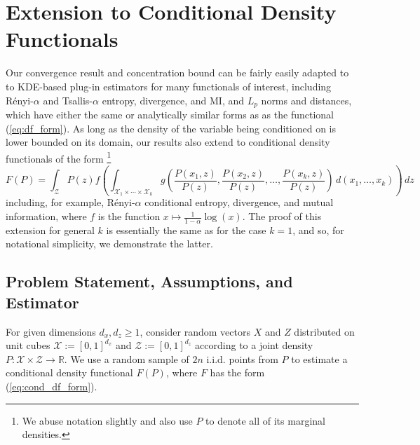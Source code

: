 \documentclass{article} %
\newcommand{\R}{\mathbb{R}}                         %
\newcommand{\X}{\mathcal{X}}                        %
\newcommand{\Z}{\mathcal{Z}}                        %
\begin{document}
\section{Extension to Conditional Density Functionals}
Our convergence result and concentration bound can be fairly easily adapted to
to KDE-based plug-in estimators for many functionals of interest, including
R\'enyi-$\alpha$ and Tsallis-$\alpha$ entropy, divergence, and MI, and
$L_p$ norms and distances, which have either the same or analytically similar
forms as as the functional (\ref{eq:df_form}). As long as the density of the
variable being conditioned on is lower bounded on its domain, our results also
extend to conditional density functionals of the form
\footnote{We abuse notation slightly and also use $P$ to denote all of its
marginal densities.}
\begin{equation}
F(P)
    = \int_\Z P(z) f\left(
            \int_{\X_1 \times \cdots \times \X_k} g\left(
                \frac{P(x_1,z)}{P(z)},
                \frac{P(x_2,z)}{P(z)},
                \dots,
                \frac{P(x_k,z)}{P(z)}
            \right) \, d(x_1,\dots,x_k)
        \right) \, dz
\label{eq:cond_df_form}
\end{equation}
including, for example, R\'enyi-$\alpha$ conditional entropy, divergence, and
mutual information, where $f$ is the function
$x \mapsto \frac{1}{1 - \alpha} \log(x)$. The proof of this extension for
general $k$ is essentially the same as for the case $k = 1$, and so, for
notational simplicity, we demonstrate the latter.

\subsection{Problem Statement, Assumptions, and Estimator}
For given dimensions $d_x,d_z \geq 1$, consider random vectors $X$ and $Z$
distributed on unit cubes $\X := [0,1]^{d_x}$ and $\Z := [0,1]^{d_z}$
according to a joint density $P : \X \times \Z \to \R$. We use a random sample
of $2n$ i.i.d. points from $P$ to estimate a conditional density functional
$F(P)$, where $F$ has the form (\ref{eq:cond_df_form}). 
\end{document}
